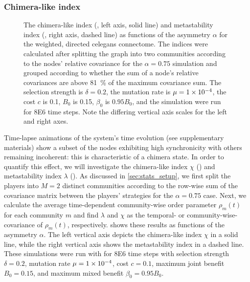 \documentclass[pdflatex,lineno,referee,sn-mathphys-ay]{sn-jnl}
\begin{document}
\subsubsection{Chimera-like index}
\begin{figure}
  \centering
  \pgfplotsset{width=0.4\textwidth}
  
  \caption{
    The chimera-like index (, left axis, solid line)
    and metastability index (,
    right axis, dashed line)
    as functions of the asymmetry $\alpha$
    for the
    weighted, directed \gls{celegans} connectome.
    The indices were calculated after splitting the graph
    into two communities according to the nodes' relative covariance
    for the $\alpha = \num{0.75}$ simulation
    and grouped according to whether the sum
    of a node's relative covariances are above
    \SI{81}{\percent} of the maximum covariance sum.
    The selection strength is $\delta=0.2$,
    the mutation rate is $\mu=\num{1E-4}$,
    the cost $c$ is \num{0.1},
    $B_0$ is \num{0.15},
    $\beta_0$ is $\num{0.95} B_0$,
    and the simulation were run for \num{8E6} time steps.
    Note the differing vertical axis scales
    for the left and right axes.
  }
  \label{fig:chimera-index}
\end{figure}

Time-lapse animations of the system's time evolution
(see supplementary materials)
show a subset of the nodes exhibiting high synchronicity
with others remaining incoherent: this is characteristic of a chimera state.
In order to quantify this effect, we will investigate
the chimera-like index $\chi$ ()
and metastability index $\lambda$ ().
As discussed in \cref{sec:stats_setup},
we first split the players into $M=2$ distinct communities
according to the row-wise sum of the covariance matrix
between the players' strategies for the $\alpha = \num{0.75}$ case.
Next, we calculate the average time-dependent community-wise
order parameter $\rho_m(t)$
for each community $m$ and find $\lambda$ and $\chi$
as the temporal- or community-wise- covariance of
$\rho_m(t)$, respectively.
 shows these results
as functions of the asymmetry $\alpha$.
The left vertical axis depicts the chimera-like index $\chi$
in a solid line,
while the right vertical axis shows the metastability index
in a dashed line.
These simulations were run with
for \num{8E6} time steps with
selection strength $\delta = 0.2$,
mutation rate $\mu=\num{1E-4}$,
cost $c = \num{0.1}$,
maximum joint benefit $B_0 = 0.15$,
and maximum mixed benefit $\beta_0 = \num{0.95} B_0$.
\end{document}
